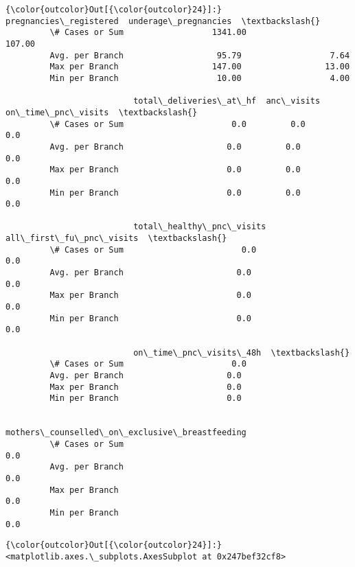 \documentclass[11pt]{article}
\begin{document}
\begin{Verbatim}[commandchars=\\\{\}]
{\color{outcolor}Out[{\color{outcolor}24}]:}                  pregnancies\_registered  underage\_pregnancies  \textbackslash{}
         \# Cases or Sum                  1341.00                107.00   
         Avg. per Branch                   95.79                  7.64   
         Max per Branch                   147.00                 13.00   
         Min per Branch                    10.00                  4.00   
         
                          total\_deliveries\_at\_hf  anc\_visits  on\_time\_pnc\_visits  \textbackslash{}
         \# Cases or Sum                      0.0         0.0                 0.0   
         Avg. per Branch                     0.0         0.0                 0.0   
         Max per Branch                      0.0         0.0                 0.0   
         Min per Branch                      0.0         0.0                 0.0   
         
                          total\_healthy\_pnc\_visits  all\_first\_fu\_pnc\_visits  \textbackslash{}
         \# Cases or Sum                        0.0                      0.0   
         Avg. per Branch                       0.0                      0.0   
         Max per Branch                        0.0                      0.0   
         Min per Branch                        0.0                      0.0   
         
                          on\_time\_pnc\_visits\_48h  \textbackslash{}
         \# Cases or Sum                      0.0   
         Avg. per Branch                     0.0   
         Max per Branch                      0.0   
         Min per Branch                      0.0   
         
                          mothers\_counselled\_on\_exclusive\_breastfeeding  
         \# Cases or Sum                                             0.0  
         Avg. per Branch                                            0.0  
         Max per Branch                                             0.0  
         Min per Branch                                             0.0  
\end{Verbatim}
            
\begin{Verbatim}[commandchars=\\\{\}]
{\color{outcolor}Out[{\color{outcolor}24}]:} <matplotlib.axes.\_subplots.AxesSubplot at 0x247bef32cf8>
\end{Verbatim}
            
\end{document}
